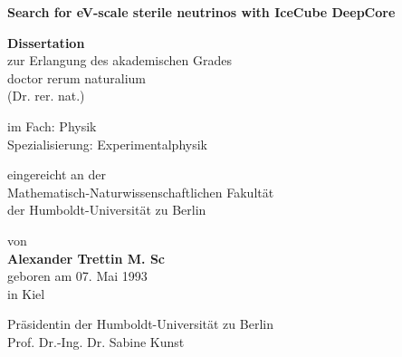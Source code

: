 \documentclass[
a4paper, %
fontsize=10pt, %
twoside=true, %
numbers=noenddot, %
fontmethod=tex, %
]{kaobook}
\begin{document}
\frontmatter %

\begin{titlepage}
	\begin{center}
	\vspace*{1cm}

	\LARGE
	\textbf{Search for eV-scale sterile neutrinos with IceCube DeepCore}
	\large

	\vspace{0.8cm}

	\textbf{Dissertation}\\
	zur Erlangung des akademischen Grades\\
	doctor rerum naturalium \\
	(Dr. rer. nat.) \\

	\vspace{0.5cm}

	im Fach: Physik \\
	Spezialisierung: Experimentalphysik\\

	\vspace{0.5cm}

	eingereicht an der \\
	Mathematisch-Naturwissenschaftlichen Fakultät\\
	der Humboldt-Universität zu Berlin\\

	\vspace{0.5cm}

	von\\
	\textbf{Alexander Trettin M. Sc}\\
	geboren am 07. Mai 1993\\
	in Kiel

	\vspace{0.5cm}

	Präsidentin der Humboldt-Universität zu Berlin\\
	Prof. Dr.-Ing. Dr. Sabine Kunst\\

	\vspace{0.5cm}


\end{center}
\end{titlepage}
\end{document}
